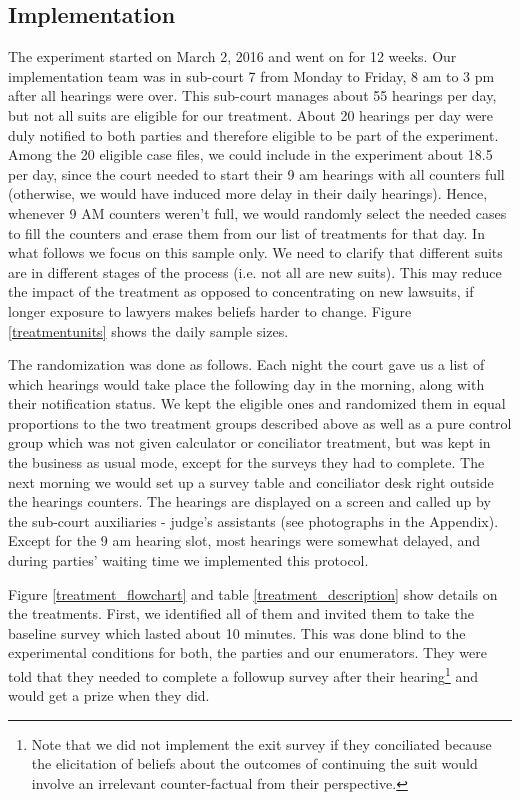 \documentclass[11pt]{article}
\begin{document}
     
     
\subsection{Implementation}
     
     The experiment started on March 2, 2016 and went on for 12 weeks. Our implementation team was in sub-court 7 from Monday to Friday, 8 am to 3 pm after all hearings were over. This sub-court manages about 55 hearings per day, but not all suits are eligible for our treatment. About 20 hearings per day were duly notified to both parties and therefore eligible to be part of the experiment. Among the 20 eligible case files, we could include in the experiment about 18.5 per day, since the court needed to start their 9 am hearings with all counters full (otherwise, we would have induced more delay in their daily hearings). Hence, whenever 9 AM counters weren't full, we would randomly select the needed cases to fill the counters and erase them from our list of treatments for that day. In what follows we focus on this sample only. We need to clarify that different suits are in different stages of the process (i.e. not all are new suits). This may reduce the impact of the treatment as opposed to concentrating on new lawsuits, if longer exposure to lawyers makes beliefs harder to change. Figure \ref{treatmentunits} shows the daily sample sizes.
     
     The randomization was done as follows. Each night the court gave us a list of which hearings would take place the following day in the morning, along with their notification status. We kept the eligible ones and randomized them in equal proportions to the two treatment groups described above as well as a pure control group which was not given calculator or conciliator treatment, but was kept in the business as usual mode, except for the surveys they had to complete. The next morning we would set up a survey table and conciliator desk right outside the hearings counters. The hearings are displayed on a screen and called up by the sub-court auxiliaries - judge's assistants (see photographs in the Appendix). Except for the 9 am hearing slot, most hearings were somewhat delayed, and during parties' waiting time we implemented this protocol. 
     
     Figure \ref{treatment_flowchart} and table \ref{treatment_description} show details on the treatments. First,   we identified all of them and invited them to take the baseline survey which lasted about 10 minutes. This was done blind to the experimental conditions for both, the parties and our enumerators. They were told that they needed to complete a followup survey after their hearing\footnote{Note that we did not implement the exit survey if they conciliated because the elicitation of beliefs about the outcomes of continuing the suit would involve an irrelevant counter-factual from their perspective.} and would get a prize when they did. 
     
\end{document}
